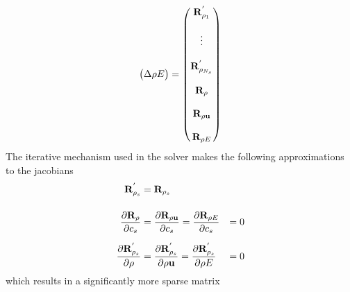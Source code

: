 \begin{equation}
\begin{pmatrix}
    \Delta \rho E
  \end{pmatrix}
  =
  \begin{pmatrix}
    \mathbf R_{\rho_1}^{'}     \\ \\
    \vdots               \\ \\
    \mathbf R_{\rho_{N_s}}^{'} \\ \\
    \mathbf R_{\rho}           \\ \\
    \mathbf R_{\rho \mathbf u}       \\ \\
    \mathbf R_{\rho E}
  \end{pmatrix}
  \label{dc-full-system}
\end{equation}
The iterative mechanism used in the solver makes the following approximations to
the jacobians
\begin{equation}
  \begin{aligned}
    \mathbf R_{\rho_s}^{'} &= \mathbf R_{\rho_s} \\[12pt]
    \frac{\partial \mathbf R_{\rho}}{\partial c_s} &= \frac{\partial \mathbf R_{\rho \mathbf u}}{\partial c_s} = \frac{\partial \mathbf R_{\rho E}}{\partial c_s} &= 0 \\[6pt]
    \frac{\partial \mathbf R^{'}_{\rho_s}}{\partial \rho} &= \frac{\partial \mathbf R^{'}_{\rho_s}}{\partial \rho \mathbf u} = \frac{\partial \mathbf R^{'}_{\rho_s}}{\partial \rho E} &= 0
  \end{aligned}
  \label{dc-approximations}
\end{equation}
which results in a significantly more sparse matrix
